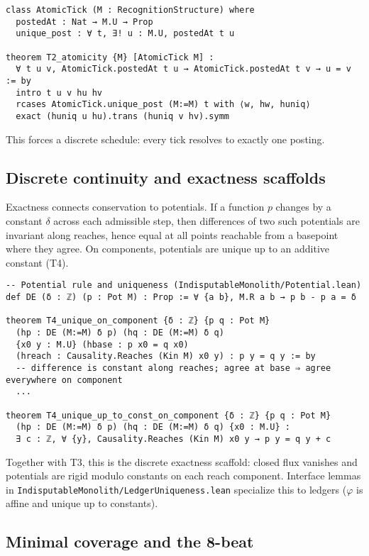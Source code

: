 \documentclass[11pt,a4paper,twoside]{article}
\numberwithin{equation}{section}
\renewcommand{\phi}{\varphi}
\theoremstyle{customthm}
\theoremstyle{customdef}
\theoremstyle{customrem}
\begin{document}
\begin{lstlisting}
class AtomicTick (M : RecognitionStructure) where
  postedAt : Nat → M.U → Prop
  unique_post : ∀ t, ∃! u : M.U, postedAt t u

theorem T2_atomicity {M} [AtomicTick M] :
  ∀ t u v, AtomicTick.postedAt t u → AtomicTick.postedAt t v → u = v := by
  intro t u v hu hv
  rcases AtomicTick.unique_post (M:=M) t with ⟨w, hw, huniq⟩
  exact (huniq u hu).trans (huniq v hv).symm
\end{lstlisting}

This forces a discrete schedule: every tick resolves to exactly one posting.

\subsection{Discrete continuity and exactness scaffolds}

Exactness connects conservation to potentials. If a function $p$ changes by a constant $\delta$ across each admissible step, then differences of two such potentials are invariant along reaches, hence equal at all points reachable from a basepoint where they agree. On components, potentials are unique up to an additive constant (T4).

\begin{lstlisting}
-- Potential rule and uniqueness (IndisputableMonolith/Potential.lean)
def DE (δ : ℤ) (p : Pot M) : Prop := ∀ {a b}, M.R a b → p b - p a = δ

theorem T4_unique_on_component {δ : ℤ} {p q : Pot M}
  (hp : DE (M:=M) δ p) (hq : DE (M:=M) δ q)
  {x0 y : M.U} (hbase : p x0 = q x0)
  (hreach : Causality.Reaches (Kin M) x0 y) : p y = q y := by
  -- difference is constant along reaches; agree at base ⇒ agree everywhere on component
  ...

theorem T4_unique_up_to_const_on_component {δ : ℤ} {p q : Pot M}
  (hp : DE (M:=M) δ p) (hq : DE (M:=M) δ q) {x0 : M.U} :
  ∃ c : ℤ, ∀ {y}, Causality.Reaches (Kin M) x0 y → p y = q y + c
\end{lstlisting}

Together with T3, this is the discrete exactness scaffold: closed flux vanishes and potentials are rigid modulo constants on each reach component. Interface lemmas in \texttt{IndisputableMonolith/LedgerUniqueness.lean} specialize this to ledgers ($\phi$ is affine and unique up to constants).

\subsection{Minimal coverage and the 8-beat}
\end{document}
